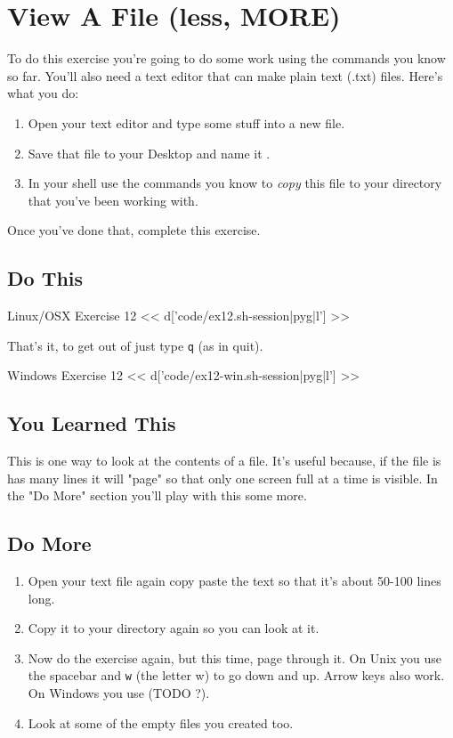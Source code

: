 \chapter{View A File (less, MORE)}

To do this exercise you're going to do some work using the commands you know so far.
You'll also need a text editor that can make plain text (.txt) files.  Here's
what you do:

\begin{enumerate}
\item Open your text editor and type some stuff into a new file.
\item Save that file to your Desktop and name it .
\item In your shell use the commands you know to \emph{copy} this file
    to your  directory that you've been working with.
\end{enumerate}

Once you've done that, complete this exercise.

\section{Do This}

\begin{code}{Linux/OSX Exercise 12}
<< d['code/ex12.sh-session|pyg|l'] >>
\end{code}

That's it, to get out of  just type \verb|q| (as in quit).

\begin{code}{Windows Exercise 12}
<< d['code/ex12-win.sh-session|pyg|l'] >>
\end{code}

\section{You Learned This}

This is one way to look at the contents of a file.  It's useful because, if the
file is has many lines it will "page" so that only one screen full at a time
is visible.  In the "Do More" section you'll play with this some more.


\section{Do More}

\begin{enumerate}
\item Open your text file again copy paste the text so that it's about 50-100 lines long.
\item Copy it to your  directory again so you can look at it.
\item Now do the exercise again, but this time, page through it.  On Unix you use
    the spacebar and \verb|w| (the letter w) to go down and up.  Arrow keys also work.  On Windows you use (TODO ?).
\item Look at some of the empty files you created too.
\end{enumerate}


